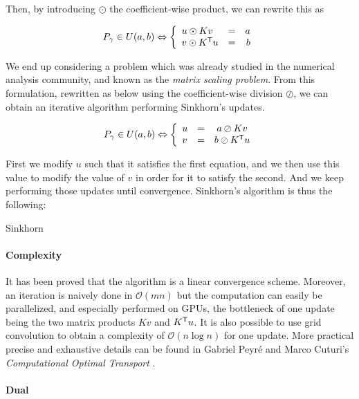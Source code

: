 Then, by introducing $\odot$ the coefficient-wise product, we can rewrite
this as

$$ P_\gamma \in U(a, b) \Leftrightarrow \left\{ \begin{array}{lrr}
u \odot K v & = & a \\
v \odot K^{\mathsf{T}} u & = & b
\end{array} \right. $$

We end up considering a problem which was already studied in the numerical
analysis community, and known as the \emph{matrix scaling problem}. From
this formulation, rewritten as below using the coefficient-wise division
$\oslash$, we can obtain an iterative algorithm performing Sinkhorn's updates.

$$ P_\gamma \in U(a, b) \Leftrightarrow \left\{ \begin{array}{lrc}
u & = & a \oslash K v \\
v & = & b \oslash K^{\mathsf{T}} u
\end{array} \right. $$

First we modify $u$ such that it satisfies the first equation, and we then
use this value to modify the value of $v$ in order for it to satisfy the
second. And we keep performing those updates until convergence. Sinkhorn's
algorithm is thus the following: \\

\begin{algorithm}
    \caption{Sinkhorn}
\end{algorithm}

\paragraph{Complexity}
It has been proved that the algorithm is a linear convergence scheme. Moreover,
an iteration is naively done in $\mathcal{O}(mn)$ but the computation can
easily be parallelized, and especially performed on GPUs, the bottleneck of one
update being the two matrix products $Kv$ and $K^{\mathsf{T}} u$. It is also
possible to use grid convolution to obtain a complexity of $\mathcal{O}(n
\log n)$ for one update. More practical precise and exhaustive details can
be found in Gabriel Peyré and Marco Cuturi's \emph{Computational Optimal
Transport} \cite{Peyr2018ComputationalOT}.

\paragraph{Dual}

